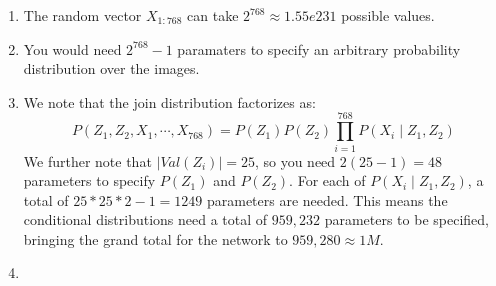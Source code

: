 \documentclass[12pt]{article}
\begin{document}
\begin{enumerate}
\item The random vector $X_{1:768}$ can take $2^{768} \approx 1.55e231$ possible values.
\item You would need $2^{768} - 1$ paramaters to specify an arbitrary probability distribution over the images.
\item We note that the join distribution factorizes as:
$$
P(Z_1, Z_2, X_1, \cdots, X_{768}) = P(Z_1)P(Z_2)\prod_{i=1}^{768}P(X_i \mid Z_1, Z_2)
$$
We further note that $|Val(Z_i)| = 25$, so you need $2(25-1) = 48$ parameters to specify $P(Z_1)$ and $P(Z_2)$. For each of $P(X_i \mid Z_1, Z_2)$, a total of $25*25*2 - 1 = 1249$ parameters are needed. This means the conditional distributions need a total of $959,232$ parameters to be specified, bringing the grand total for the network to $959,280 \approx 1M$.
\item 
\end{enumerate}
\end{document}
